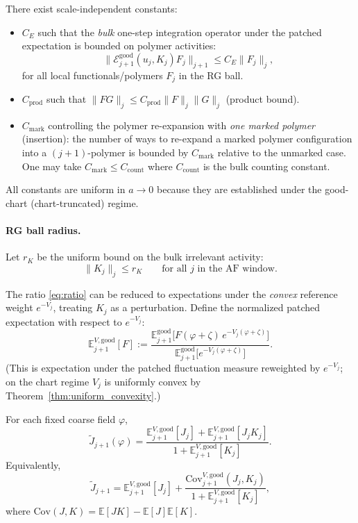 \begin{proposition}\label{ass:C_constants}
There exist scale-independent constants:
\begin{itemize}
\item $C_E$ such that the \emph{bulk} one-step integration operator under the patched expectation is bounded on polymer activities:
\[
\|\mathcal E^{\mathrm{good}}_{j+1}(u_j,K_j)F_j\|_{j+1}\le C_E\|F_j\|_j,
\]
for all local functionals/polymers $F_j$ in the RG ball.
\item $C_{\mathrm{prod}}$ such that $\|FG\|_j\le C_{\mathrm{prod}}\|F\|_j\|G\|_j$ (product bound).
\item $C_{\mathrm{mark}}$ controlling the polymer re-expansion with \emph{one marked polymer} (insertion):
the number of ways to re-expand a marked polymer configuration into a $(j+1)$-polymer is bounded by $C_{\mathrm{mark}}$
relative to the unmarked case. One may take $C_{\mathrm{mark}}\le C_{\mathrm{count}}$ where $C_{\mathrm{count}}$ is the bulk counting constant.
\end{itemize}
All constants are uniform in $a\to0$ because they are established under the good-chart (chart-truncated) regime.
\end{proposition}

\paragraph{RG ball radius.}
Let $r_K$ be the uniform bound on the bulk irrelevant activity:
\[
\|K_j\|_j\le r_K\qquad\text{for all }j \text{ in the AF window}.
\]

The ratio \eqref{eq:ratio} can be reduced to expectations under the \emph{convex} reference weight $e^{-V_j}$, treating $K_j$ as a perturbation.
Define the normalized patched expectation with respect to $e^{-V_j}$:
\begin{equation}\label{eq:EVdef}
\mathbb E^{V,\mathrm{good}}_{j+1}[F]
:=
\frac{\mathbb E^{\mathrm{good}}_{j+1}\!\big[F(\varphi+\zeta)\,e^{-V_j(\varphi+\zeta)}\big]}
{\mathbb E^{\mathrm{good}}_{j+1}\!\big[e^{-V_j(\varphi+\zeta)}\big]}.
\end{equation}
(This is expectation under the patched fluctuation measure reweighted by $e^{-V_j}$; on the chart regime $V_j$ is uniformly convex by Theorem~\ref{thm:uniform_convexity}.)

\begin{lemma}\label{lem:ratio_decomp}
For each fixed coarse field $\varphi$,
\begin{equation}\label{eq:ratio_decomp}
\widetilde J_{j+1}(\varphi)
=
\frac{\mathbb E^{V,\mathrm{good}}_{j+1}[J_j]+\mathbb E^{V,\mathrm{good}}_{j+1}[J_j K_j]}
{1+\mathbb E^{V,\mathrm{good}}_{j+1}[K_j]}.
\end{equation}
Equivalently,
\[
\widetilde J_{j+1}=\mathbb E^{V,\mathrm{good}}_{j+1}[J_j]
+
\frac{\mathrm{Cov}^{V,\mathrm{good}}_{j+1}(J_j,K_j)}{1+\mathbb E^{V,\mathrm{good}}_{j+1}[K_j]},
\]
where $\mathrm{Cov}(J,K)=\mathbb E[JK]-\mathbb E[J]\mathbb E[K]$.
\end{lemma}

